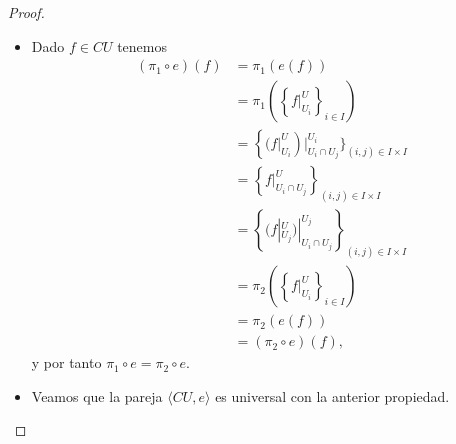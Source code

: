 \begin{proof}
   \begin{itemize}
      \item Dado $f\in CU$ tenemos
         $$
         \begin{aligned}
            (\pi_1\circ e)(f)&=\pi_1(e(f))\\
                             &=\pi_1\left(\left\lbrace f|^U_{U_i}\right\rbrace_{i\in I}\right)\\
                             &=\left\lbrace (f|^U_{U_i}\right)|^{U_i}_{U_i\cap U_j}\rbrace_{(i,j)\in I\times I}\\
                             &=\left\lbrace f|^U_{U_i\cap U_j}\right\rbrace_{(i,j)\in I\times I}\\
                             &=\left\lbrace (f|^U_{U_j})|^{U_j}_{U_i\cap U_j}\right\rbrace_{(i,j)\in I\times I}\\
                             &=\pi_2\left(\left\lbrace f|^U_{U_i}\right\rbrace_{i\in I}\right)\\
                             &=\pi_2(e(f))\\
                             &=(\pi_2\circ e)(f),
         \end{aligned}
         $$
         y por tanto $\pi_1\circ e=\pi_2\circ e$.
      \item Veamos que la pareja $\langle CU,e\rangle$ es universal con la anterior propiedad.
   \end{itemize}
\end{proof}

